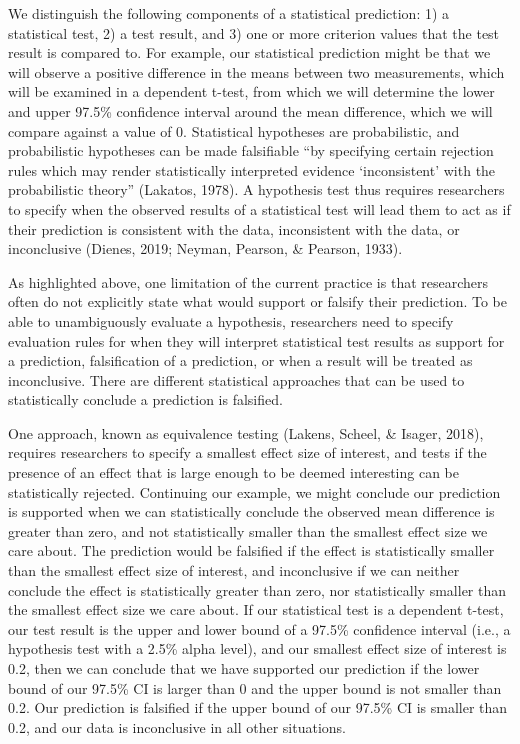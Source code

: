\documentclass[doc,floatsintext]{apa6}
\begin{document}
We distinguish the following components of a statistical prediction: 1) a statistical test, 2) a test result, and 3) one or more criterion values that the test result is compared to. For example, our statistical prediction might be that we will observe a positive difference in the means between two measurements, which will be examined in a dependent t-test, from which we will determine the lower and upper 97.5\% confidence interval around the mean difference, which we will compare against a value of 0. Statistical hypotheses are probabilistic, and probabilistic hypotheses can be made falsifiable \enquote{by specifying certain rejection rules which may render statistically interpreted evidence \enquote{inconsistent} with the probabilistic theory} (Lakatos, 1978). A hypothesis test thus requires researchers to specify when the observed results of a statistical test will lead them to act as if their prediction is consistent with the data, inconsistent with the data, or inconclusive (Dienes, 2019; Neyman, Pearson, \& Pearson, 1933).

As highlighted above, one limitation of the current practice is that researchers often do not explicitly state what would support or falsify their prediction. To be able to unambiguously evaluate a hypothesis, researchers need to specify evaluation rules for when they will interpret statistical test results as support for a prediction, falsification of a prediction, or when a result will be treated as inconclusive. There are different statistical approaches that can be used to statistically conclude a prediction is falsified.

One approach, known as equivalence testing (Lakens, Scheel, \& Isager, 2018), requires researchers to specify a smallest effect size of interest, and tests if the presence of an effect that is large enough to be deemed interesting can be statistically rejected. Continuing our example, we might conclude our prediction is supported when we can statistically conclude the observed mean difference is greater than zero, and not statistically smaller than the smallest effect size we care about. The prediction would be falsified if the effect is statistically smaller than the smallest effect size of interest, and inconclusive if we can neither conclude the effect is statistically greater than zero, nor statistically smaller than the smallest effect size we care about. If our statistical test is a dependent t-test, our test result is the upper and lower bound of a 97.5\% confidence interval (i.e., a hypothesis test with a 2.5\% alpha level), and our smallest effect size of interest is 0.2, then we can conclude that we have supported our prediction if the lower bound of our 97.5\% CI is larger than 0 and the upper bound is not smaller than 0.2. Our prediction is falsified if the upper bound of our 97.5\% CI is smaller than 0.2, and our data is inconclusive in all other situations.
\end{document}
